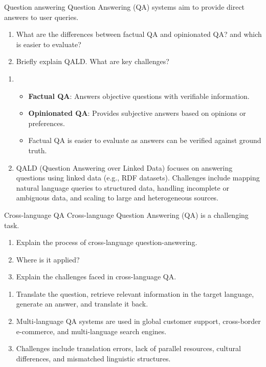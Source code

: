 \documentclass{article}
\begin{document}
\begin{exercise}{Question answering}\label{ex:qa}
  Question Answering (QA) systems aim to provide direct answers to user queries.
  \begin{enumerate}
    \item What are the differences between factual QA and opinionated QA? and which is easier to evaluate?
    \item Briefly explain QALD. What are key challenges?
  \end{enumerate}

  \begin{solution}
    \begin{enumerate}
      \item \begin{itemize}
          \item \textbf{Factual QA}: Answers objective questions with verifiable information.
          \item \textbf{Opinionated QA}: Provides subjective answers based on opinions or preferences.
          \item Factual QA is easier to evaluate as answers can be verified against ground truth.
        \end{itemize}
      \item QALD (Question Answering over Linked Data) focuses on answering questions using linked data (e.g., RDF datasets). Challenges include mapping natural language queries to structured data, handling incomplete or ambiguous data, and scaling to large and heterogeneous sources.
    \end{enumerate}
  \end{solution}
\end{exercise}

\begin{exercise}{Cross-language QA}\label{ex:cross-lang-qa}
  Cross-language Question Answering (QA) is a challenging task.
  \begin{enumerate}
    \item Explain the process of cross-language question-answering.
    \item Where is it applied?
    \item Explain the challenges faced in cross-language QA.
  \end{enumerate}

  \begin{solution}
    \begin{enumerate}
        \item Translate the question, retrieve relevant information in the target language, generate an answer, and translate it back.
        \item Multi-language QA systems are used in global customer support, cross-border e-commerce, and multi-language search engines.
        \item Challenges include translation errors, lack of parallel resources, cultural differences, and mismatched linguistic structures.
    \end{enumerate}
  \end{solution}
\end{exercise}
\end{document}
